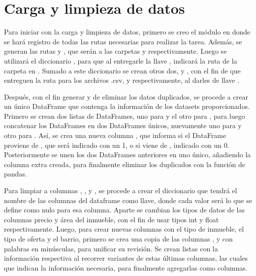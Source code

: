 \section{Carga y limpieza de datos}

Para iniciar con la carga y limpieza de datos, primero se creo el módulo  en donde se hará registro de todas las rutas necesarias para realizar la tarea. Además, se generan las rutas  y , que serán a las carpetas  y  respectivamente. Luego se utilizará el diccionario , para que al entregarle la llave , indicará la ruta de la carpeta  en . Sumado a este diccionario se crean otros dos,  y , con el fin de que entreguen la ruta para los archivos .csv,  y  respectivamente, al darles de llave .

Después, con el fin generar  y de eliminar los datos duplicados, se procede a crear un único DataFrame que contenga la información de los datasets proporcionados. Primero se crean dos listas de DataFrames, uno para  y el otro para , para luego concatenar los DataFrames en dos DataFrames únicos, nuevamente uno para  y otro para . Así, se crea una nueva columna , que informa si el DataFrame proviene de , que será indicado con un 1, o si viene de , indicado con un 0. Posteriormente se unen los dos DataFrames anteriores en uno único, añadiendo la columna extra creada, para finalmente eliminar los duplicados con la función  de pandas.

Para limpiar a columnas , ,  y , se procede a crear el diccionario  que tendrá el nombre de las columnas del dataframe como llave, donde cada valor será lo que se define como nulo para esa columna. Aparte se cambian los tipos de datos de las columnas precio y área del inmueble, con el fin de usar tipos int y float respectivamente. Luego, para crear nuevas columnas con el tipo de inmueble, el tipo de oferta y el barrio, primero se crea una copia de las columnas ,  y  con palabras en minúsculas, para unificar su revisión. Se crean listas con la información respectiva al recorrer variantes de estas últimas columnas, las cuales que indican la información necesaria, para finalmente agregarlas como columnas.

